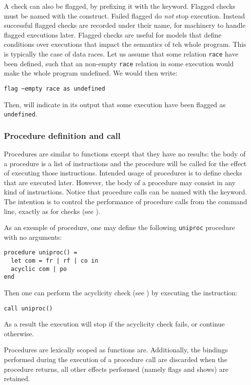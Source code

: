 A check can also be flagged, by prefixing it with the 
keyword. Flagged checks must be named with the  construct.
Failed flagged do \emph{not} stop execution.
Instead successful flagged checks are recorded under their name,
for \herd{} machinery to handle flagged executions later.
Flagged checks are useful for models that define conditions
over executions that impact the semantics of teh whole program.
This is typically the case of data races.
Let us assume that some relation \verb+race+ have been defined,
such that an non-empty \verb+race+ relation in  some execution
would make the whole program undefined. We would then write:
\begin{verbatim}
flag ~empty race as undefined
\end{verbatim}
Then, \herd{} will indicate in its output that some
execution have been flagged as \verb+undefined+.




\subsubsection*{Procedure definition and call}
Procedures are similar to functions except that they have no results:
the body of a procedure is a list of instructions
and the procedure will be called for the effect of executing
those instructions. Intended usage of procedures is to define checks
that are executed later. However, the body of a procedure may
consist in any kind of instructions.
Notice that procedure calls can be named with the  keyword.
The intention is to control the performance of procedure calls
from  the command line, exactly as for checks (see
).


As an exemple of procedure,
one may define the following \verb+uniproc+ procedure with
no arguments:
\begin{verbatim}
procedure uniproc() =
  let com = fr | rf | co in
  acyclic com | po
end
\end{verbatim}
Then one can perform the acyclicity check (see
) by executing the instruction:
\begin{verbatim}
call uniproc()
\end{verbatim}
As a result the execution will stop if the acyclicity check fails,
or continue otherwise.

Procedures are lexically scoped as functions are.
Additionally, the bindings performed during the execution of a procedure call
are discarded when the procedure returns, all other effects performed
(namely flags and shows) are retained.

